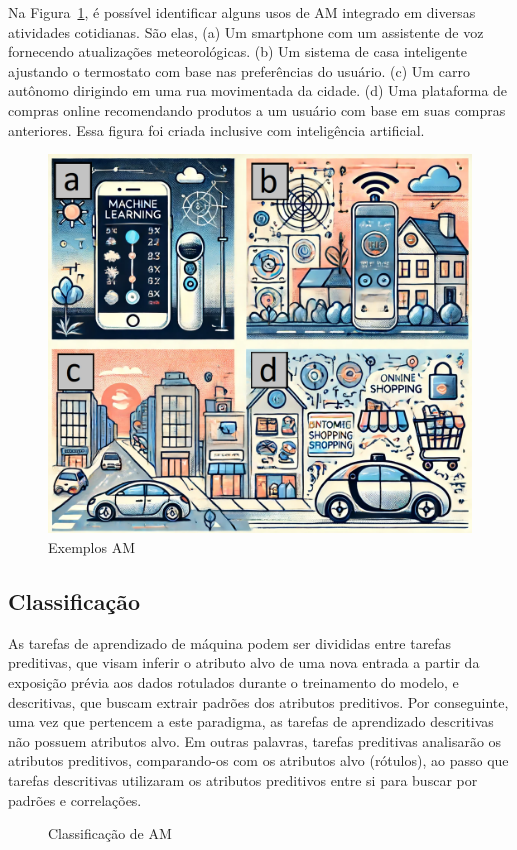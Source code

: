 \documentclass[a4paper,12pt]{book}
\begin{document}
Na Figura~\ref{fig:exemplosam}, é possível identificar alguns usos de AM integrado em diversas atividades cotidianas. São elas, (a) Um smartphone com um assistente de voz fornecendo atualizações meteorológicas. (b) Um sistema de casa inteligente ajustando o termostato com base nas preferências do usuário. (c) Um carro autônomo dirigindo em uma rua movimentada da cidade. (d) Uma plataforma de compras online recomendando produtos a um usuário com base em suas compras anteriores. Essa figura foi criada inclusive com inteligência artificial.

\begin{figure}
	\centering
	\includegraphics[width=0.7\linewidth]{figuras/exemplos_am}
	\caption{Exemplos AM}
	\label{fig:exemplosam}
\end{figure}

\subsection{Classificação}

As tarefas de aprendizado de máquina podem ser divididas entre tarefas preditivas, que visam inferir o atributo alvo de uma nova entrada a partir da exposição prévia aos dados rotulados durante o treinamento do modelo, e descritivas, que buscam extrair padrões dos atributos preditivos. Por conseguinte, uma vez que pertencem a este paradigma, as tarefas de aprendizado descritivas não possuem atributos alvo. Em outras palavras, tarefas preditivas analisarão os atributos preditivos, comparando-os com os atributos alvo (rótulos), ao passo que tarefas descritivas utilizaram os atributos preditivos entre si para buscar por padrões e correlações.

\begin{figure}
	\centering
	\caption{Classificação de AM}
	\label{fig:indutivo}
\end{figure}
\end{document}
